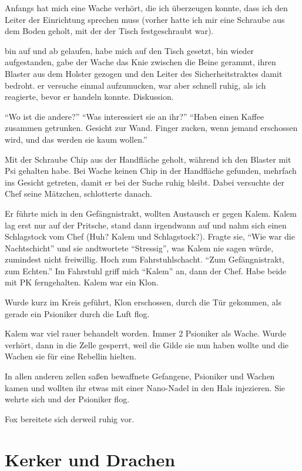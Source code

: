 \documentclass[11pt]{scrartcl}
\begin{document}
Anfangs hat mich eine Wache verhört, die ich überzeugen konnte, dass ich
den Leiter der Einrichtung sprechen muss (vorher hatte ich mir eine
Schraube aus dem Boden geholt, mit der der Tisch festgeschraubt war).

bin auf und ab gelaufen, habe mich auf den Tisch gesetzt, bin wieder
aufgestanden, gabe der Wache das Knie zwischen die Beine gerammt, ihren
Blaster aus dem Holster gezogen und den Leiter des Sicherheitstraktes
damit bedroht. er versuche einmal aufzumucken, war aber schnell ruhig,
als ich reagierte, bevor er handeln konnte. Diskussion.

``Wo ist die andere?'' ``Was interessiert sie an ihr?'' ``Haben einen
Kaffee zusammen getrunken. Gesicht zur Wand. Finger zucken, wenn jemand
erschossen wird, und das werden sie kaum wollen.''

Mit der Schraube Chip aus der Handfläche geholt, während ich den Blaster
mit Psi gehalten habe. Bei Wache keinen Chip in der Handfläche gefunden,
mehrfach ins Gesicht getreten, damit er bei der Suche ruhig bleibt.
Dabei versuchte der Chef seine Mätzchen, schlotterte danach.

Er führte mich in den Gefängnistrakt, wollten Austausch er gegen Kalem.
Kalem lag erst nur auf der Pritsche, stand dann irgendwann auf und nahm
sich einen Schlagstock vom Chef (Huh? Kalem und Schlagstock?). Fragte
sie, ``Wie war die Nachtschicht'' und sie andtwortete ``Stressig'', was
Kalem nie sagen würde, zumindest nicht freiwillig. Hoch zum
Fahrstuhlschacht. ``Zum Gefängnistrakt, zum Echten.'' Im Fahrstuhl griff
mich ``Kalem'' an, dann der Chef. Habe beide mit PK ferngehalten. Kalem
war ein Klon.

Wurde kurz im Kreis geführt, Klon erschossen, durch die Tür gekommen,
als gerade ein Psioniker durch die Luft flog.

Kalem war viel rauer behandelt worden. Immer 2 Psioniker als Wache.
Wurde verhört, dann in die Zelle gesperrt, weil die Gilde sie nun haben
wollte und die Wachen sie für eine Rebellin hielten.

In allen anderen zellen saßen bewaffnete Gefangene, Psioniker und Wachen
kamen und wollten ihr etwas mit einer Nano-Nadel in den Hals injezieren.
Sie wehrte sich und der Psioniker flog.

Fox bereitete sich derweil ruhig vor.

\section{Kerker und Drachen}
\end{document}
